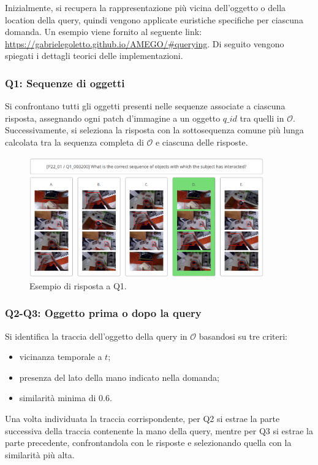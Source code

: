 Inizialmente, si recupera la rappresentazione più vicina dell'oggetto o della location della query, quindi vengono applicate euristiche specifiche per ciascuna domanda. Un esempio viene fornito al seguente link: \url{https://gabrielegoletto.github.io/AMEGO/#querying}.  
Di seguito vengono spiegati i dettagli teorici delle implementazioni.

\subsubsection*{Q1: Sequenze di oggetti}
Si confrontano tutti gli oggetti presenti nelle sequenze associate a ciascuna risposta, assegnando ogni patch d'immagine a un oggetto $q\_id$ tra quelli in $\mathcal{O}$. Successivamente, si seleziona la risposta con la sottosequenza comune più lunga calcolata tra la sequenza completa di $\mathcal{O}$ e ciascuna delle risposte.

\begin{figure}[H]
    \centering
    \includegraphics[width=0.9\textwidth]{Images/q1_res.png}
    \caption{Esempio di risposta a Q1.}
    \label{fig:q1_example}
\end{figure}

\subsubsection*{Q2-Q3: Oggetto prima o dopo la query}
Si identifica la traccia dell'oggetto della query in $\mathcal{O}$ basandosi su tre criteri:
\begin{itemize}
    \item vicinanza temporale a $t$;
    \item presenza del lato della mano indicato nella domanda;
    \item similarità minima di 0.6.
\end{itemize}
Una volta individuata la traccia corrispondente, per Q2 si estrae la parte successiva della traccia contenente la mano della query, mentre per Q3 si estrae la parte precedente, confrontandola con le risposte e selezionando quella con la similarità più alta.

